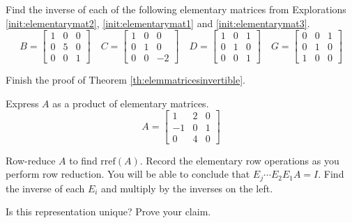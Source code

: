 \documentclass{ximera}
\begin{document}
\begin{problem}\label{prob:elem_mat_inv}
Find the inverse of each of the following elementary matrices from Explorations \ref{init:elementarymat2}, \ref{init:elementarymat1} and \ref{init:elementarymat3}.
$$
 B = \begin{bmatrix}  
 1&0&0\\0&5&0\\0&0&1
 \end{bmatrix}\quad
 C = \begin{bmatrix}  
 1&0&0\\0&1&0\\0&0&-2
 \end{bmatrix}
 \quad
 D = \begin{bmatrix}  
 1&0&1\\0&1&0\\0&0&1
 \end{bmatrix}\quad 
 G =  \begin{bmatrix}  
 0&0&1\\0&1&0\\1&0&0
 \end{bmatrix}
 $$
\end{problem}

\begin{problem}\label{prob:proofofelemmatricesinvert}
Finish the proof of Theorem \ref{th:elemmatricesinvertible}.
\end{problem}

\begin{problem}\label{prob:prodelemmatrices}
Express $A$ as a product of elementary matrices.
$$A=\begin{bmatrix}1&2&0\\-1&0&1\\0&4&0\end{bmatrix}$$
\begin{hint}
Row-reduce $A$ to find $\mbox{rref}(A)$.  Record the elementary row operations as you perform row reduction.  You will be able to conclude that $E_j\cdots E_2E_1A=I$.  Find the inverse of each $E_i$ and multiply by the inverses on the left.
\end{hint}
Is this representation unique?  Prove your claim.
\end{problem}
\end{document}
